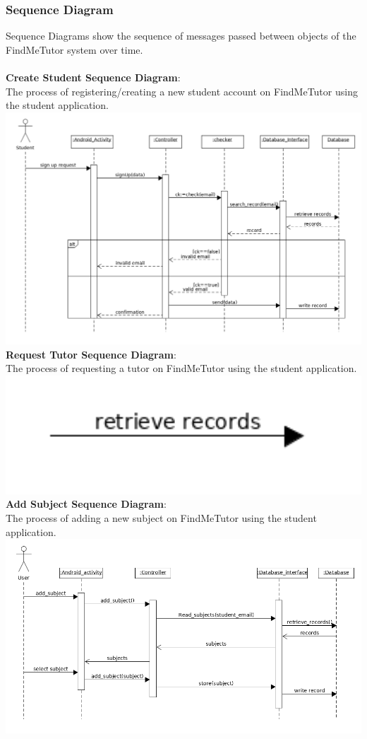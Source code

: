 \documentclass[12pt]{article}
\begin{document}
\subsubsection{Sequence Diagram}
Sequence Diagrams show the sequence of messages passed between objects of the FindMeTutor system over time.\\
\\\textbf{Create Student Sequence Diagram}:\\
The process of registering/creating a new student account on FindMeTutor using the student application.\\
\includegraphics[width=140mm]{./sequence_diagram/create_student.png}
\newpage
\textbf{Request Tutor Sequence Diagram}:\\
The process of requesting a tutor on FindMeTutor using the student application.\\
\includegraphics[width=140mm]{./sequence_diagram/request_tutor.png}
\newpage
\textbf{Add Subject Sequence Diagram}:\\
The process of adding a new subject on FindMeTutor using the student application.\\
\includegraphics[width=140mm]{./sequence_diagram/add_subject.png}
\end{document}
